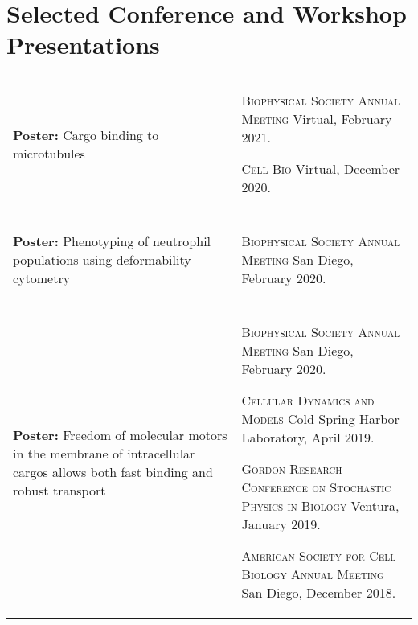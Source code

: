 \documentclass[letterpaper,10pt]{article} %
\makeatletter
\newcommand\cellwidth{\TX@col@width}
\makeatother
\begin{document}
\bigskip
\section*{Selected Conference and Workshop Presentations}
\bigskip

\begin{tabularx}{\textwidth}{p{} | X}

\begin{minipage}{.4\textwidth}
\textbf{Poster:} Cargo binding to microtubules
\end{minipage}
&
\begin{minipage}{\cellwidth}
\begin{description}[itemsep=.25ex,labelsep=0em]
\item \textsc{Biophysical Society Annual Meeting} Virtual, February 2021.
\item \textsc{Cell Bio} Virtual, December 2020.
\end{description}
\end{minipage} \\

\multicolumn{2}{c}{} \\

\begin{minipage}{.4\textwidth}
\textbf{Poster:} Phenotyping of neutrophil populations using deformability cytometry
\end{minipage}
&
\begin{minipage}{\cellwidth}
\begin{description}[itemsep=.25ex,labelsep=0em]
\item \textsc{Biophysical Society Annual Meeting} San Diego, February 2020.
\end{description}
\end{minipage} \\

\multicolumn{2}{c}{} \\

\begin{minipage}{.4\textwidth}
\textbf{Poster:} Freedom of molecular motors in the membrane of intracellular cargos allows both fast binding and robust transport
\end{minipage}
&
\begin{minipage}{\cellwidth}
\begin{description}[itemsep=.25ex,labelsep=0em]
\item \textsc{Biophysical Society Annual Meeting} San Diego, February 2020.
\item \textsc{Cellular Dynamics and Models} Cold Spring Harbor Laboratory, April 2019.
\item \textsc{Gordon Research Conference on Stochastic Physics in Biology} Ventura, January 2019.
\item \textsc{American Society for Cell Biology Annual Meeting} San Diego, December 2018.
\end{description}
\end{minipage} \\


\end{tabularx}
\end{document}
